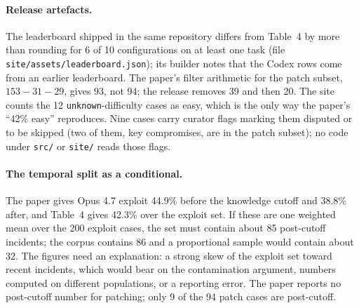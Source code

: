 \documentclass[11pt]{article}
\newcommand{\code}[1]{\texttt{\small #1}}
\begin{document}
\paragraph{Release artefacts.} The leaderboard shipped in the same repository differs from Table~4 by more than rounding for 6 of 10 configurations on at least one task (file \code{site/assets/leaderboard.json}); its builder notes that the Codex rows come from an earlier leaderboard. The paper's filter arithmetic for the patch subset, $153-31-29$, gives 93, not 94; the release removes 39 and then 20. The site counts the 12 \code{unknown}-difficulty cases as easy, which is the only way the paper's ``42\% easy'' reproduces. Nine cases carry curator flags marking them disputed or to be skipped (two of them, key compromises, are in the patch subset); no code under \code{src/} or \code{site/} reads those flags.

\paragraph{The temporal split as a conditional.} The paper gives Opus 4.7 exploit 44.9\% before the knowledge cutoff and 38.8\% after, and Table~4 gives 42.3\% over the exploit set. If these are one weighted mean over the 200 exploit cases, the set must contain about 85 post-cutoff incidents; the corpus contains 86 and a proportional sample would contain about 32. The figures need an explanation: a strong skew of the exploit set toward recent incidents, which would bear on the contamination argument, numbers computed on different populations, or a reporting error. The paper reports no post-cutoff number for patching; only 9 of the 94 patch cases are post-cutoff.
\end{document}
